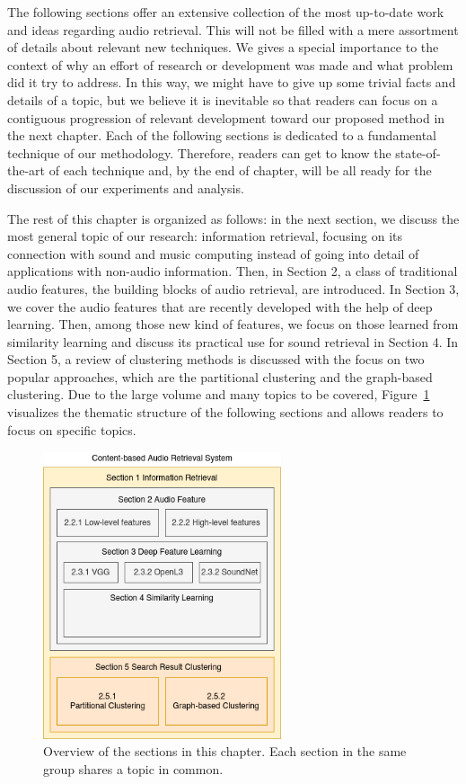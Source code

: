 The following sections offer an extensive collection of the most up-to-date work and ideas regarding audio retrieval. This will not be filled with a mere assortment of details about relevant new techniques. We gives a special importance to the context of why an effort of research or development was made and what problem did it try to address. In this way, we might have to give up some trivial facts and details of a topic, but we believe it is inevitable so that readers can focus on a contiguous progression of relevant development toward our proposed method in the next chapter. Each of the following sections is dedicated to a fundamental technique of our methodology. Therefore, readers can get to know the state-of-the-art of each technique and, by the end of chapter, will be all ready for the discussion of our experiments and analysis.


The rest of this chapter is organized as follows: in the next section, we discuss the most general topic of our research: information retrieval, focusing on its connection with sound and music computing instead of going into detail of applications with non-audio information. Then, in Section 2, a class of traditional audio features, the building blocks of audio retrieval, are introduced. In Section 3, we cover the audio features that are recently developed with the help of deep learning. Then, among those new kind of features, we focus on those learned from similarity learning and discuss its practical use for sound retrieval in Section 4. In Section 5, a review of clustering methods is discussed with the focus on two popular approaches, which are the partitional clustering and the graph-based clustering. Due to the large volume and many topics to be covered, Figure~\ref{toc-figrue} visualizes the thematic structure of the following sections and allows readers to focus on specific topics.

\begin{figure}[htb]
	\centering
	\includegraphics[width=7cm]{Figures/conceptual_relationship_of_sections.png}
	\caption{Overview of the sections in this chapter. Each section in the same group shares a topic in common.}
	\label{toc-figrue}
\end{figure}

